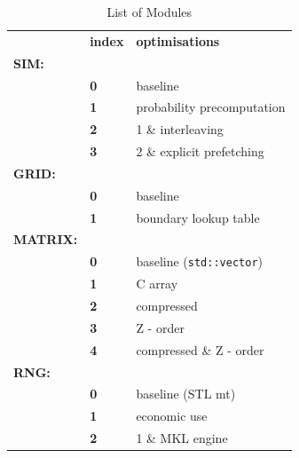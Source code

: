 \documentclass[letterpaper]{article}
\begin{document}
\begin{table}[h]
\begin{tabular}{ll|l}
& \textbf{index} & \textbf{optimisations} \\\cline{2-3}
\textbf{SIM:} \\\hline
& \textbf{0} & baseline \\\cline{2-3}
& \textbf{1} & probability precomputation\\\cline{2-3}
& \textbf{2} & 1 \& interleaving \\\cline{2-3}
& \textbf{3} & 2 \& explicit prefetching\\\cline{2-3}
\textbf{GRID:}\\\hline
& \textbf{0} & baseline \\\cline{2-3}
& \textbf{1} & boundary lookup table \\\cline{2-3}
\textbf{MATRIX:}\\\hline
& \textbf{0} & baseline (\texttt{std::vector}) \\\cline{2-3}
& \textbf{1} & C array \\\cline{2-3}
& \textbf{2} & compressed \\\cline{2-3}
& \textbf{3} & Z - order \\\cline{2-3}
& \textbf{4} & compressed \& Z - order\\\cline{2-3}
\textbf{RNG:} \\\hline
& \textbf{0} & baseline (STL mt)\\\cline{2-3}
& \textbf{1} & economic use \\\cline{2-3}
& \textbf{2} & 1 \& MKL engine\\\cline{2-3}
\end{tabular}
\caption{List of Modules}
\label{modlist}
\end{table}
\end{document}
